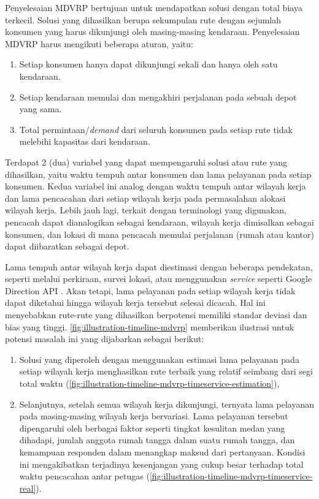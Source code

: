 Penyelesaian MDVRP bertujuan untuk mendapatkan solusi dengan total biaya terkecil. Solusi yang dihasilkan berupa sekumpulan rute dengan sejumlah konsumen yang harus dikunjungi oleh masing-masing kendaraan. Penyelesaian MDVRP harus mengikuti beberapa aturan, yaitu:

\begin{enumerate}
	\item Setiap konsumen hanya dapat dikunjungi sekali dan hanya oleh satu kendaraan. 
	\item Setiap kendaraan memulai dan mengakhiri perjalanan pada sebuah depot yang sama. 
	\item Total permintaan/\textit{demand} dari seluruh konsumen pada setiap rute tidak melebihi kapasitas dari kendaraan.
\end{enumerate}

Terdapat 2 (dua) variabel yang dapat mempengaruhi solusi atau rute yang dihasilkan, yaitu waktu tempuh antar konsumen dan lama pelayanan pada setiap konsumen. Kedua variabel ini analog dengan waktu tempuh antar wilayah kerja dan lama pencacahan dari setiap wilayah kerja pada permasalahan alokasi wilayah kerja. Lebih jauh lagi, terkait dengan terminologi yang digunakan, pencacah dapat dianalogikan sebagai kendaraan, wilayah kerja dimisalkan sebagai konsumen, dan lokasi di mana pencacah memulai perjalanan (rumah atau kantor) dapat diibaratkan sebagai depot.

Lama tempuh antar wilayah kerja dapat diestimasi dengan beberapa pendekatan, seperti melalui perkiraan, survei lokasi, atau menggunakan \textit{service} seperti Google Direction API \citep{google_google_2016}. Akan tetapi, lama pelayanan pada setiap wilayah kerja tidak dapat diketahui hingga wilayah kerja tersebut selesai dicacah. Hal ini menyebabkan rute-rute yang dihasilkan berpotensi memiliki standar deviasi dan bias yang tinggi. \autoref{fig:illustration-timeline-mdvrp} memberikan ilustrasi untuk potensi masalah ini yang dijabarkan sebagai berikut:

\begin{enumerate}
	\item Solusi yang diperoleh dengan menggunakan estimasi lama pelayanan pada setiap wilayah kerja menghasilkan rute terbaik yang relatif seimbang dari segi total waktu (\autoref{fig:illustration-timeline-mdvrp-timeservice-estimation}), 
	\item Selanjutnya, setelah semua wilayah kerja dikunjungi, ternyata lama pelayanan pada masing-masing wilayah kerja bervariasi. Lama pelayanan tersebut dipengaruhi oleh berbagai faktor seperti tingkat kesulitan medan yang dihadapi, jumlah anggota rumah tangga dalam suatu rumah tangga, dan kemampuan responden dalam menangkap maksud dari pertanyaan. Kondisi ini mengakibatkan terjadinya kesenjangan yang cukup besar terhadap total waktu pencacahan antar petugas (\autoref{fig:illustration-timeline-mdvrp-timeservice-real}).
\end{enumerate}


